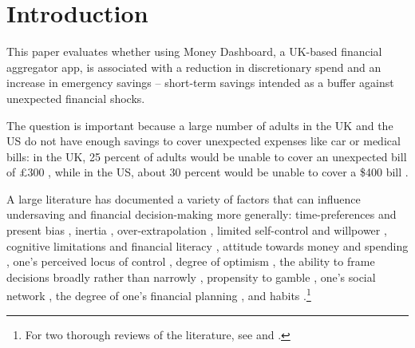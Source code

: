
\section{Introduction}%
\label{sec:introduction}

This paper evaluates whether using Money Dashboard, a UK-based financial
aggregator app, is associated with a reduction in discretionary spend and an
increase in emergency savings -- short-term savings intended as a buffer
against unexpected financial shocks.

The question is important because a large number of adults in the UK and the US
do not have enough savings to cover unexpected expenses like car or medical
bills: in the UK, 25 percent of adults would be unable to cover an unexpected
bill of \pounds300 \citep{phillips2021supporting}, while in the US, about 30
percent would be unable to cover a \$400 bill \citep{fed2022economic}.

A large literature has documented a variety of factors that can influence
undersaving and financial decision-making more generally: time-preferences and
present bias \citep{laibson1997golden, frederick2002time,
read2018intertemporal, ericson2019intertemporal, cohen2020measuring}, inertia
\citep{madrian2001power}, over-extrapolation \citep{choi2009reinforcement},
limited self-control and willpower \citep{thaler1981economic,
  benhabib2005modeling, o1999doing, fudenberg2006dual, loewenstein2004animal,
gul2001temptation}, cognitive limitations and financial literacy
\citep{agarwal2009age, agarwal2013cognitive, korniotis2011older,
agarwal2010learning, fernandes2014financial, jorring2020financial}, attitude
towards money and spending \citep{rick2008tightwads, rick2011fatal}, one's
perceived locus of control \citep{perry2005control}, degree of optimism
\citep{puri2007optimism}, the ability to frame decisions broadly rather than
narrowly \citep{kumar2008decision}, propensity to gamble
\citep{kumar2009gambles}, one's social network \citep{bailey2018economic,
kuchler2021social}, the degree of one's financial planning
\citep{ameriks2003wealth}, and habits \citep{blumenstock2018defaults,
schaner2018persistent, de2013deposit}.\footnote{For two thorough reviews of the
literature, see \citet{agarwal2017shapes} and \citet{greenberg2019financial}.}


